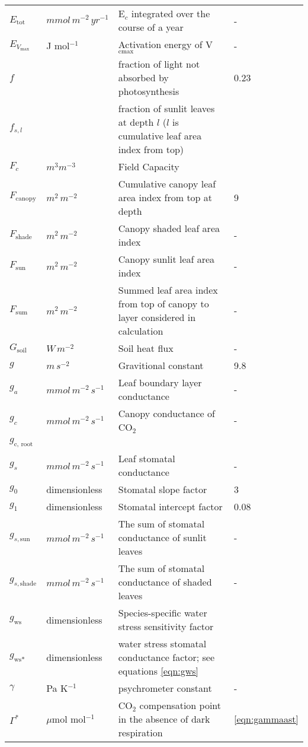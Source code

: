 \documentclass[10pt]{article}
\begin{document}
\begin{center}
\begin{longtable}{l l p{3in} p{0.5in}}
$E_\text{tot}$	&	$mmol\, m^{-2}\, yr^{-1}$	&	E$_c$ integrated over the course of a year	&	-	\\
$E_{V_\text{max}}$ & J mol$^{-1}$ & Activation energy of V$_\text{cmax}$& - \\
$f$ & & fraction of light not absorbed by photosynthesis & 0.23 \\
$f_{s,l}$ & & fraction of sunlit leaves at depth $l$ ($l$ is cumulative leaf area index from top) & \\
$F_c$ & $m^3m^{-3}$ & Field Capacity & \\
$F_{\text{canopy}}$	&	$m^2\, m^{-2}$	&Cumulative canopy leaf area index from top at depth	&	9	\\
$F_{\text{shade}}$	&	$m^2\, m^{-2}$	&	Canopy shaded leaf area index	&	-	\\
$F_{\text{sun}}$	&	$m^2\,m^{-2}$	&	Canopy sunlit leaf area index	&	-	\\
$F_{\text{sum}}$	&	$m^2\, m^{-2}$	&	Summed leaf area index from top of canopy to layer considered in calculation	&	-	\\
$G_{\text{soil}}$	&	$W\,m^{-2}$	&	Soil heat flux	&	-	\\
$g$	&	$m\, s^{-2}$	&	Gravitional constant	&	9.8	\\
$g_a$	&	$mmol\,m^{-2}\, s^{-1}$	&	Leaf boundary layer conductance	&	-	\\
$g_c$	&	$mmol\,m^{-2}\, s^{-1}$	&	Canopy conductance of CO$_2$ 	&	-	\\
$g_\text{c, root}$	&	& & \marginnote{undefined}\\
$g_s$	&	$mmol\,m^{-2}\, s^{-1}$	&	Leaf stomatal conductance	&	-	\\
$g_0$	&	dimensionless	&	Stomatal slope factor	&	3	\\
$g_1$	&	dimensionless	&	Stomatal intercept factor	&	0.08	\\
$g_{s,\text{sun}}$	&	$mmol\, m^{-2}\, s^{-1}$	&	The sum of stomatal conductance of sunlit leaves	&	-	\\
$g_{s,\text{shade}}$	&	$mmol\, m^{-2}\, s^{-1}$	&	The sum of stomatal conductance of shaded leaves	&	-	\\
$g_\text{ws}$ & dimensionless & Species-specific water stress sensitivity factor & \\
$g_\text{ws*}$ & dimensionless & water stress stomatal conductance factor; see equations \ref{eqn:gws} &\\
$\gamma$	&	Pa K$^{-1}$	&	psychrometer constant 	&	-	\\
$\Gamma^\ast$ & $\mu$mol mol$^{-1}$ & CO$_2$ compensation point in the absence of dark respiration & \ref{eqn:gammaast}\\

\end{longtable}
\end{center}
\end{document}
